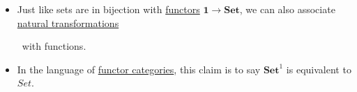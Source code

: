 \begin{itemize}
    \item  Just like sets are in bijection with \href{doc/1 math/Seven Sketches in Compositionality/Chapter 3: Databases/3 Functors, natural transformations, and databases/2 Functors/1 Functor}{functors} $\mathbf{1}\rightarrow\mathbf{Set}$, we can also associate \,\href{doc/1 math/Seven Sketches in Compositionality/Chapter 3: Databases/3 Functors, natural transformations, and databases/4 Natural transformations/1 Natural transformation}{natural transformations} \, with functions.
    \item In the language of \href{doc/1 math/Seven Sketches in Compositionality/Chapter 3: Databases/3 Functors, natural transformations, and databases/4 Natural transformations/3 Functor category}{functor categories}, this claim is to say $\mathbf{Set}^1$ is equivalent to $Set$.
  \end{itemize}
